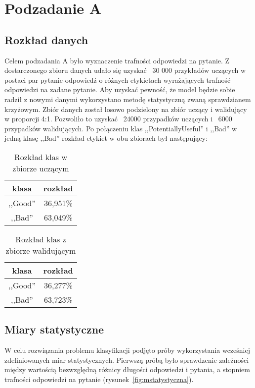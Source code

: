 \section{Podzadanie A}
\subsection{Rozkład danych}
Celem podzadania A było wyznaczenie trafności odpowiedzi na pytanie. Z dostarczonego zbioru danych udało się uzyskać ~30 000 przykładów uczących w postaci par pytanie-odpowiedź o różnych etykietach wyrażających trafność odpowiedzi na zadane pytanie. 
Aby uzyskać pewność, że model będzie sobie radził z nowymi danymi wykorzystano metodę statystyczną zwaną sprawdzianem krzyżowym. Zbiór danych został losowo podzielony na zbiór uczący i walidujący w proporcji 4:1. Pozwoliło to uzyskać ~24000 przypadków uczących i ~6000 przypadków walidujących. Po połączeniu klas ,,PotentiallyUseful'' i ,,Bad'' w jedną klasę ,,Bad'' rozkład etykiet w obu zbiorach był następujący:

\begin{table}[H]
\caption{Rozkład klas w zbiorze uczącym}
\label{train_set_statistics_score_table}
    \begin{center}
        \begin{tabular}{ |c|c| } 
            \hline
            klasa & rozkład\\
            \hline
            ,,Good'' & 36,951\% \\
            \hline
            ,,Bad'' & 63,049\% \\
            \hline
        \end{tabular}
    \end{center}
\end{table}

\begin{table}[H]
\caption{Rozkład klas z zbiorze walidującym}
\label{train_set_statistics_score_table}
    \begin{center}
        \begin{tabular}{ |c|c| } 
            \hline
            klasa & rozkład\\
            \hline
            ,,Good'' & 36,277\% \\
            \hline
            ,,Bad'' & 63,723\% \\
            \hline
        \end{tabular}
    \end{center}
\end{table}
\subsection{Miary statystyczne}
W celu rozwiązania problemu klasyfikacji podjęto próby wykorzystania wcześniej zdefiniowanych miar statystycznych. Pierwszą próbą było sprawdzenie zależności między wartością bezwzględną różnicy długości odpowiedzi i pytania, a stopniem trafności odpowiedzi na pytanie (rysunek~\ref{fig:mstatystyczna}).


